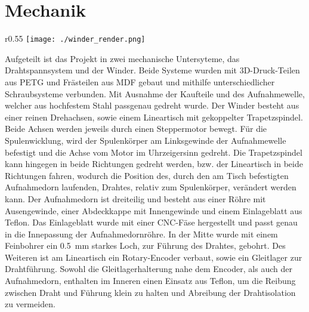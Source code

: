 \section{Mechanik}
\label{sec:Mechanik}




\begin{wrapfigure}{r}{0.55\textwidth}
    \centering
    \texttt{[image: ./winder\_render.png]}
\end{wrapfigure}

Aufgeteilt ist das Projekt in zwei mechanische Untersyteme, das Drahtspannsystem und der Winder.
Beide Systeme wurden mit 3D-Druck-Teilen aus PETG und Frästeilen aus MDF gebaut und mithilfe unterschiedlicher Schraubsysteme verbunden. Mit Ausnahme der Kaufteile und des Aufnahmewelle, welcher aus hochfestem Stahl passgenau gedreht wurde.
\newline
Der Winder besteht aus einer reinen Drehachsen, sowie einem Lineartisch mit gekoppelter Trapetzspindel. Beide Achsen werden jeweils durch einen Steppermotor bewegt. Für die Spulenwicklung, wird der Spulenkörper am Linksgewinde der Aufnahmewelle befestigt und die Achse vom Motor im Uhrzeigersinn gedreht. Die Trapetzspindel kann hingegen in beide Richtungen gedreht werden, bzw. der Lineartisch in beide Richtungen fahren, wodurch die Position des, durch den am Tisch befestigten Aufnahmedorn laufenden, Drahtes, relativ zum Spulenkörper, verändert werden kann. Der Aufnahmedorn ist dreiteilig und besteht aus einer Röhre mit Ausengewinde, einer Abdeckkappe mit Innengewinde und einem Einlageblatt aus Teflon. Das Einlageblatt wurde mit einer CNC-Fäse hergestellt und passt genau in die Innepassung der Aufnahmedornröhre. In der Mitte wurde mit einem Feinbohrer ein 0.5~\si{\milli\metre} starkes Loch, zur Führung des Drahtes, gebohrt.
Des Weiteren ist am Lineartisch ein Rotary-Encoder verbaut, sowie ein Gleitlager zur Drahtführung. Sowohl die Gleitlagerhalterung nahe dem Encoder, als auch der Aufnahmedorn, enthalten im Inneren einen Einsatz aus Teflon, um die Reibung zwischen Draht und Führung klein zu halten und Abreibung der Drahtisolation zu vermeiden. \newline
